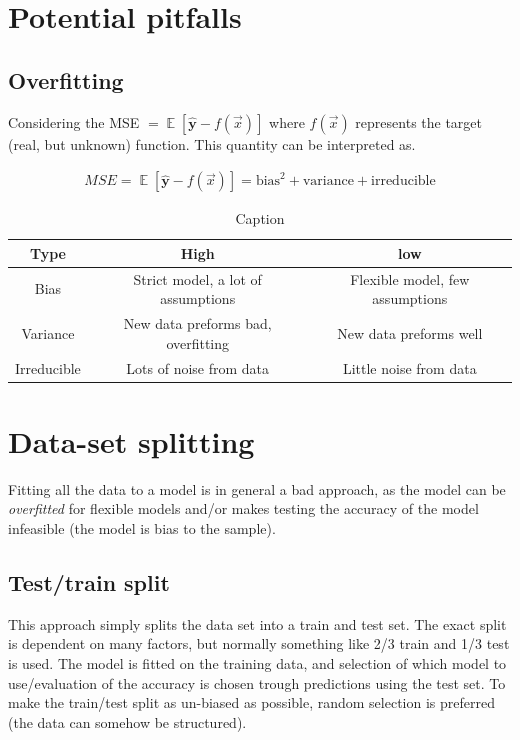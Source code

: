 \documentclass{article}
\newcommand{\uvec}[1]{\mathbf{\hat{#1}}}
\DeclareMathOperator*{\E}{\mathbb{E}}
\begin{document}
\section{Potential pitfalls}
\subsection{Overfitting}
Considering the MSE $ = \E[\uvec{y}-f(\Vec{x})]$ where $f(\Vec{x})$ represents the target (real, but unknown) function. This quantity can be interpreted as.

\begin{align*}
    MSE = \E[\uvec{y}-f(\Vec{x})] = \text{bias}^2 + \text{variance} + \text{irreducible}
\end{align*}

\begin{table}[H]
    \centering
    \begin{tabular}{|c|c|c|}
         \hline
         Type &  High & low\\
         \hline
         Bias & Strict model, a lot of assumptions & Flexible model, few assumptions \\
         \hline
         Variance & New data preforms bad, overfitting & New data preforms well \\
         \hline
         Irreducible & Lots of noise from data &  Little noise from data\\
         \hline
    \end{tabular}
    \caption{Caption}
    \label{tab:my_label}
\end{table}

\section{Data-set splitting}
Fitting all the data to a model is in general a bad approach, as the model can be \textit{overfitted} for flexible models and/or makes testing the accuracy of the model infeasible (the model is bias to the sample). 

\subsection{Test/train split}
This approach simply splits the data set into a train and test set. The exact split is dependent on many factors, but normally something like 2/3 train and 1/3 test is used. The model is fitted on the training data, and selection of which model to use/evaluation of the accuracy is chosen trough predictions using the test set. To make the train/test split as un-biased as possible, random selection is preferred (the data can somehow be structured).
\end{document}
